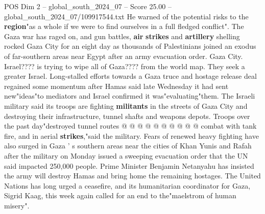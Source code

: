 \begin{textsample}{POS Dim 2 – global\_south\_2024\_07 – Score 25.00 – global\_south\_2024\_07/109917544.txt}
He warned of the potential risks to the \textbf{region}"as a whole if we were to find ourselves in a full fledged conflict".
The Gaza war has raged on, and gun battles, \textbf{air} \textbf{strikes} and \textbf{artillery} shelling rocked Gaza City for an eight day as thousands of Palestinians joined an exodus of far-southern areas near Egypt after an army evacuation order.
Gaza City.
Israel???? is trying to wipe all of Gaza???? from the world map.
They seek a greater Israel.
Long-stalled efforts towards a Gaza truce and hostage release deal regained some momentum after Hamas said late Wednesday it had sent new"ideas"to mediators and Israel confirmed it was"evaluating"them.
The Israeli military said its troops are fighting \textbf{militants} in the streets of Gaza City and destroying their infrastructure, tunnel shafts and weapons depots.
Troops over the past day"destroyed tunnel routes @ @ @ @ @ @ @ @ @ @ combat with tank fire, and in aerial \textbf{strikes},"said the military.
Fears of renewed heavy fighting have also surged in Gaza ' s southern areas near the cities of Khan Yunis and Rafah after the military on Monday issued a sweeping evacuation order that the UN said impacted 250,000 people.
Prime Minister Benjamin Netanyahu has insisted the army will destroy Hamas and bring home the remaining hostages.
The United Nations has long urged a ceasefire, and its humanitarian coordinator for Gaza, Sigrid Kaag, this week again called for an end to the"maelstrom of human misery".

\end{textsample}
